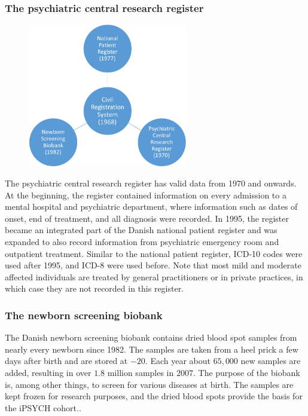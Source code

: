 \subsubsection{The psychiatric central research register}
\begin{figure}
	\includegraphics[width=7cm]{intro/registers.png}
	\label{fig:registerBubbles}
\end{figure}

The psychiatric central research register has valid data from 1970 and onwards. At the beginning, the register contained information on every admission to a mental hospital and psychiatric department, where information such as dates of onset, end of treatment, and all diagnosis were recorded. In 1995, the register became an integrated part of the Danish national patient register and was expanded to also record information from psychiatric emergency room and outpatient treatment. Similar to the national patient register, ICD-10 codes were used after 1995, and ICD-8 were used before. Note that most mild and moderate affected individuals are treated by general practitioners or in private practices, in which case they are not recorded in this register.\cite{mors2011danish}


\subsubsection{The newborn screening biobank}
The Danish newborn screening biobank contains dried blood spot samples from nearly every newborn since 1982. The samples are taken from a heel prick a few days after birth and are stored at $ -20 $\textcelsius. Each year about $ 65,000 $ new samples are added, resulting in over $ 1.8 $ million samples in $ 2007 $. The purpose of the biobank is, among other things, to screen for various diseases at birth. The samples are kept frozen for research purposes, and the dried blood spots provide the basis for the iPSYCH cohort.\cite{norgaard2007storage}.

